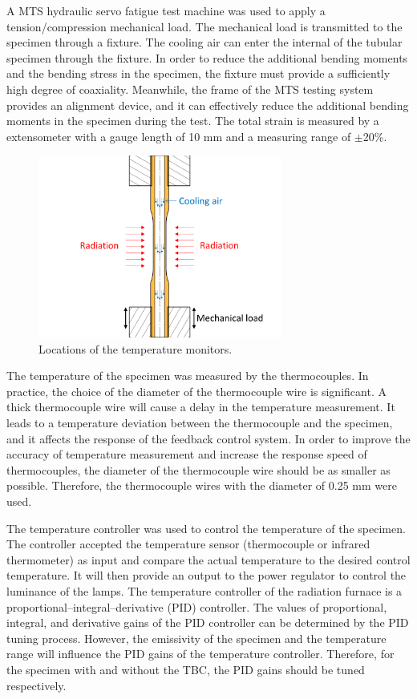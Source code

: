 \documentclass[preprint,5p,twocolumn,11pt,sort&compress]{elsarticle}
\begin{document}
A MTS hydraulic servo fatigue test machine was used to apply a tension/compression mechanical load. The mechanical load is transmitted to the specimen through a fixture. The cooling air can enter the internal of the tubular specimen through the fixture. In order to reduce the additional bending moments and the bending stress in the specimen, the fixture must provide a sufficiently high degree of coaxiality. Meanwhile, the frame of the MTS testing system provides an alignment device, and it can effectively reduce the additional bending moments in the specimen during the test. The total strain is measured by a extensometer with a gauge length of 10 mm and a measuring range of $\pm$20\%. 

\begin{figure}[!htp]
	\centering
	\includegraphics[width=8.0cm]{cooling.png}
	\caption{Locations of the temperature monitors.}
	\label{Fig:cooling}
\end{figure}

The temperature of the specimen was measured by the thermocouples. In practice, the choice of the diameter of the thermocouple wire is significant. A thick thermocouple wire will cause a delay in the temperature measurement. It leads to a temperature deviation between the thermocouple and the specimen, and it affects the response of the feedback control system. In order to improve the accuracy of temperature measurement and increase the response speed of thermocouples, the diameter of the thermocouple wire should be as smaller as possible. Therefore, the thermocouple wires with the diameter of 0.25 mm were used.

The temperature controller was used to control the temperature of the specimen.
The controller accepted the temperature sensor (thermocouple or infrared thermometer) as input and compare the actual temperature to the desired control temperature. It will then provide an output to the power regulator to control the luminance of the lamps. 
The temperature controller of the radiation furnace is a proportional–integral–derivative (PID) controller. The values of proportional, integral, and derivative gains of the PID controller can be determined by the PID tuning process.
However, the emissivity of the specimen and the temperature range will influence the PID gains of the temperature controller. Therefore, for the specimen with and without the TBC, the PID gains should be tuned respectively.
\end{document}

